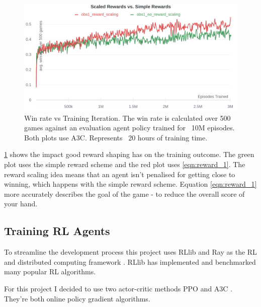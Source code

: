 \documentclass[../main.tex]{subfiles}
\begin{document}
\begin{figure}
    \centering
    \includegraphics[width=\textwidth,keepaspectratio]{images/method/obs1_reward_scaling_comp.png}
    \caption{Win rate vs Training Iteration. The win rate is calculated over 500 games against an evaluation agent policy trained for ~10M episodes. Both plots use A3C. Represents ~20 hours of training time.}
    \label{fig:reward_scheme_comp}
\end{figure}

\cref{fig:reward_scheme_comp} shows the impact good reward shaping has on the training outcome. The green plot uses the simple reward scheme and the red plot uses \eqref{eqn:reward_1}. The reward scaling idea means that an agent isn't penalised for getting close to winning, which happens with the simple reward scheme. Equation \eqref{eqn:reward_1} more accurately describes the goal of the game - to reduce the overall score of your hand. 

\subsection{Training RL Agents}
To streamline the development process this project uses RLlib and Ray as the RL and distributed computing framework \cite{liang_rllib_2018}. RLlib has implemented and benchmarked many popular RL algorithms.


For this project I decided to use two actor-critic methods PPO \cite{schulman_proximal_2017} and A3C \cite{mnih_asynchronous_2016}. They're both online policy gradient algorithms. 
\end{document}
